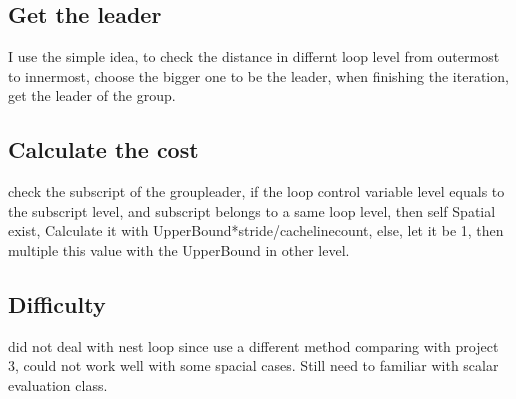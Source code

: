 \subsection{Get the leader}
I use the simple idea, to check the distance in differnt loop level
from outermost to innermost, choose the bigger one to be the leader,
when finishing the iteration, get the leader of the group.

\subsection{Calculate the cost}
check the subscript of the groupleader, if the loop control variable
level equals to the subscript level, and subscript belongs to a same
loop level, then self Spatial exist, Calculate it with
UpperBound*stride/cachelinecount, else, let it be 1, then multiple
this value with the UpperBound in other level.

\subsection{Difficulty}
did not deal with nest loop since use a different method comparing
with project 3, could not work well with some spacial cases.
Still need to familiar with scalar evaluation class.




\begin{flushright}
\end{flushright}
